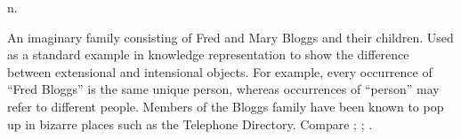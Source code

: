  n.

An imaginary family consisting of Fred and Mary Bloggs and their children. Used
as a standard example in knowledge representation to show the difference between
extensional and intensional objects. For example, every occurrence of ``Fred
Bloggs'' is the same unique person, whereas occurrences of ``person'' may refer
to different people. Members of the Bloggs family have been known to pop up in
bizarre places such as the  Telephone Directory. Compare
; ; .

